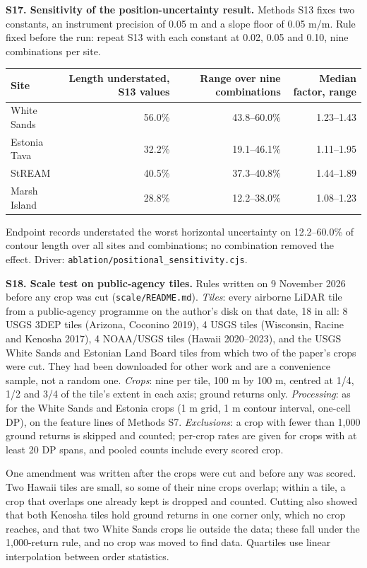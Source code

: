 \documentclass[11pt]{article}
\begin{document}
\vspace{4mm}
\noindent\textbf{S17. Sensitivity of the position-uncertainty result.} Methods S13 fixes two constants, an instrument precision of 0.05 m and a slope floor of 0.05 m/m. Rule fixed before the run: repeat S13 with each constant at 0.02, 0.05 and 0.10, nine combinations per site.

\begin{center}\scriptsize
\begin{tabular}{@{}lrrr@{}}
\toprule
Site & Length understated, S13 values & Range over nine combinations & Median factor, range \\
\midrule
White Sands & 56.0\% & 43.8--60.0\% & 1.23--1.43 \\
Estonia Tava & 32.2\% & 19.1--46.1\% & 1.11--1.95 \\
StREAM & 40.5\% & 37.3--40.8\% & 1.44--1.89 \\
Marsh Island & 28.8\% & 12.2--38.0\% & 1.08--1.23 \\
\bottomrule
\end{tabular}
\end{center}

\noindent Endpoint records understated the worst horizontal uncertainty on 12.2--60.0\% of contour length over all sites and combinations; no combination removed the effect. Driver: \texttt{ablation/positional\_sensitivity.cjs}.

\vspace{4mm}
\noindent\textbf{S18. Scale test on public-agency tiles.} Rules written on 9 November 2026 before any crop was cut (\texttt{scale/README.md}). \emph{Tiles}: every airborne LiDAR tile from a public-agency programme on the author's disk on that date, 18 in all: 8 USGS 3DEP tiles (Arizona, Coconino 2019), 4 USGS tiles (Wisconsin, Racine and Kenosha 2017), 4 NOAA/USGS tiles (Hawaii 2020--2023), and the USGS White Sands and Estonian Land Board tiles from which two of the paper's crops were cut. They had been downloaded for other work and are a convenience sample, not a random one. \emph{Crops}: nine per tile, 100 m by 100 m, centred at 1/4, 1/2 and 3/4 of the tile's extent in each axis; ground returns only. \emph{Processing}: as for the White Sands and Estonia crops (1 m grid, 1 m contour interval, one-cell DP), on the feature lines of Methods S7. \emph{Exclusions}: a crop with fewer than 1,000 ground returns is skipped and counted; per-crop rates are given for crops with at least 20 DP spans, and pooled counts include every scored crop.

One amendment was written after the crops were cut and before any was scored. Two Hawaii tiles are small, so some of their nine crops overlap; within a tile, a crop that overlaps one already kept is dropped and counted. Cutting also showed that both Kenosha tiles hold ground returns in one corner only, which no crop reaches, and that two White Sands crops lie outside the data; these fall under the 1,000-return rule, and no crop was moved to find data. Quartiles use linear interpolation between order statistics.
\end{document}
